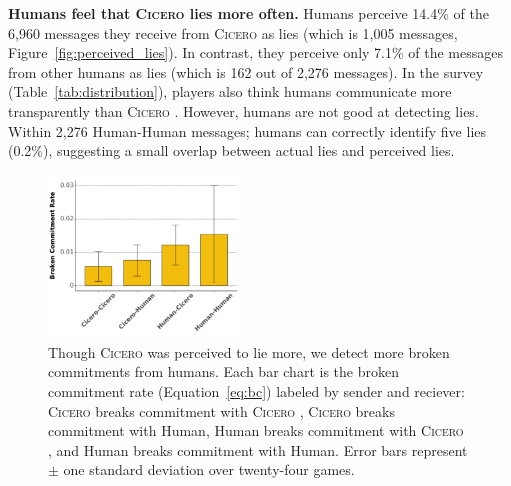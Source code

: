 \documentclass[oneside]{memoir}
\newcommand{\cicero}{\abr{Cicero} }
\newcommand{\abr}[1]{\textsc{#1}}
\begin{document}

\textbf{Humans feel that \cicero{} lies more often. }
%
%
Humans perceive 14.4\% of the 6,960 messages they receive from \cicero{} as lies (which is 1,005 messages, Figure~\ref{fig:perceived_lies}). In contrast, they perceive only 7.1\% of the messages from other humans as lies (which is 162 out of 2,276 messages).
%
In the survey (Table~\ref{tab:distribution}), players also think humans communicate more transparently than \cicero{}.
%
However, humans are not good at detecting lies.
%
Within 2,276 Human-Human messages; humans
can correctly identify five lies (0.2\%), suggesting a small overlap
between actual lies and perceived lies.
%


\begin{figure}[t]
    \centering
    \includegraphics[width=0.45\textwidth]{figures/detect_deception_rate.pdf}
    \caption{Though \cicero{} was perceived to lie more, we detect more broken commitments from humans.
    Each bar chart is the broken commitment rate (Equation~\ref{eq:bc}) labeled by sender and reciever: \cicero{} breaks commitment with \cicero{}, \cicero{} breaks commitment with Human, Human breaks commitment with \cicero{}, and Human breaks commitment with Human. Error bars represent $\pm$ one standard deviation over twenty-four games. }
    \label{fig:dec_rate}
\end{figure}
\end{document}
